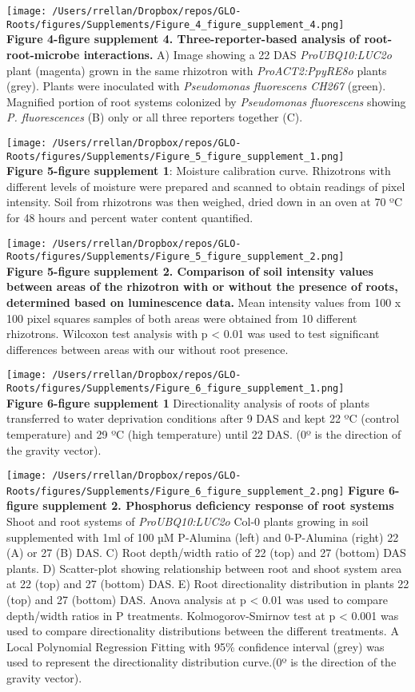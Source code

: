 \documentclass[]{article}
\begin{document}
\texttt{[image: /Users/rrellan/Dropbox/repos/GLO-Roots/figures/Supplements/Figure\_4\_figure\_supplement\_4.png]}\\\textbf{Figure
4-figure supplement 4. Three-reporter-based analysis of
root-root-microbe interactions.} A) Image showing a 22 DAS
\emph{ProUBQ10:LUC2o} plant (magenta) grown in the same rhizotron with
\emph{ProACT2:PpyRE8o} plants (grey). Plants were inoculated with
\emph{Pseudomonas fluorescens CH267} (green). Magnified portion of root
systems colonized by \emph{Pseudomonas fluorescens} showing \emph{P.
fluorescences} (B) only or all three reporters together (C).

\texttt{[image: /Users/rrellan/Dropbox/repos/GLO-Roots/figures/Supplements/Figure\_5\_figure\_supplement\_1.png]}\\\textbf{Figure
5-figure supplement 1}: Moisture calibration curve. Rhizotrons with
different levels of moisture were prepared and scanned to obtain
readings of pixel intensity. Soil from rhizotrons was then weighed,
dried down in an oven at 70 ºC for 48 hours and percent water content
quantified.

\texttt{[image: /Users/rrellan/Dropbox/repos/GLO-Roots/figures/Supplements/Figure\_5\_figure\_supplement\_2.png]}\\\textbf{Figure
5-figure supplement 2. Comparison of soil intensity values between areas
of the rhizotron with or without the presence of roots, determined based
on luminescence data.} Mean intensity values from 100 x 100 pixel
squares samples of both areas were obtained from 10 different
rhizotrons. Wilcoxon test analysis with p \textless{} 0.01 was used to
test significant differences between areas with our without root
presence.

\texttt{[image: /Users/rrellan/Dropbox/repos/GLO-Roots/figures/Supplements/Figure\_6\_figure\_supplement\_1.png]}\\\textbf{Figure
6-figure supplement 1} Directionality analysis of roots of plants
transferred to water deprivation conditions after 9 DAS and kept 22 ºC
(control temperature) and 29 ºC (high temperature) until 22 DAS. (0º is
the direction of the gravity vector).

\texttt{[image: /Users/rrellan/Dropbox/repos/GLO-Roots/figures/Supplements/Figure\_6\_figure\_supplement\_2.png]}
\textbf{Figure 6-figure supplement 2. Phosphorus deficiency response of
root systems} Shoot and root systems of \emph{ProUBQ10:LUC2o} Col-0
plants growing in soil supplemented with 1ml of 100 µM P-Alumina (left)
and 0-P-Alumina (right) 22 (A) or 27 (B) DAS. C) Root depth/width ratio
of 22 (top) and 27 (bottom) DAS plants. D) Scatter-plot showing
relationship between root and shoot system area at 22 (top) and 27
(bottom) DAS. E) Root directionality distribution in plants 22 (top) and
27 (bottom) DAS. Anova analysis at p \textless{} 0.01 was used to
compare depth/width ratios in P treatments. Kolmogorov-Smirnov test at p
\textless{} 0.001 was used to compare directionality distributions
between the different treatments. A Local Polynomial Regression Fitting
with 95\% confidence interval (grey) was used to represent the
directionality distribution curve.(0º is the direction of the gravity
vector).
\end{document}
